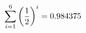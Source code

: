 \documentclass[preview]{standalone}
\begin{document}
\begin{align*}
\sum_{i=1}^{ 6 } \left({ 1 } \over {2} \right)^i = { 0.984375 }
\end{align*}
\end{document}
